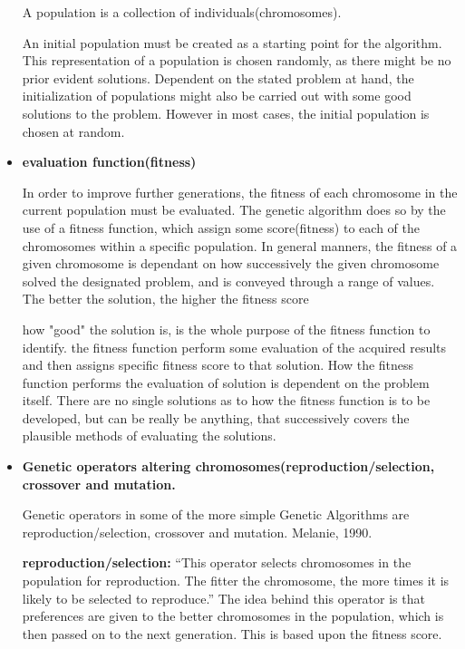 \begin{itemize}
A population is a collection of individuals(chromosomes).



An initial population must be created as a starting point for the algorithm. This representation of a population is chosen randomly, as there might be no prior evident solutions. Dependent on the stated problem at hand, the initialization of populations might also be carried out with some good solutions to the problem. However in most cases, the initial population is chosen at random. \cite[pp. 41/42]{Sivanandam2008}





\item \textbf{evaluation function(fitness)}

In order to improve further generations, the fitness of each chromosome in the current population must be evaluated. The genetic algorithm does so by the use of a fitness function, which assign some score(fitness) to each of the chromosomes within a specific population.
In general manners, the fitness of a given chromosome is dependant on how successively the given chromosome solved the designated problem, and is conveyed through a range of values. The better the solution, the higher the fitness score \cite[pp. 8]{Melanie1990}

how "good" the solution is, is the whole purpose of the fitness function to identify. the fitness function perform some evaluation of the acquired results and then assigns specific fitness score to that solution. How the fitness function performs the evaluation of solution is dependent on the problem itself. There are no single solutions as to how the fitness function is to be developed, but can be really be anything, that successively covers the plausible methods of evaluating the solutions. \cite[pp. 31]{Sivanandam2008}




\item \textbf{Genetic operators altering chromosomes(reproduction/selection, crossover and mutation.}


Genetic operators in some of the more simple Genetic Algorithms are reproduction/selection, crossover and mutation. Melanie, 1990. \cite{Melanie1990}

\textbf{reproduction/selection:} \enquote{This operator selects chromosomes in the population for reproduction. The fitter the chromosome, the more times it is likely to be selected to reproduce.} \cite[pp. 8]{Melanie1990}
The idea behind this operator is that preferences are given to the better chromosomes in the population, which is then passed on to the next generation. This is based upon the fitness score.


\end{itemize}

